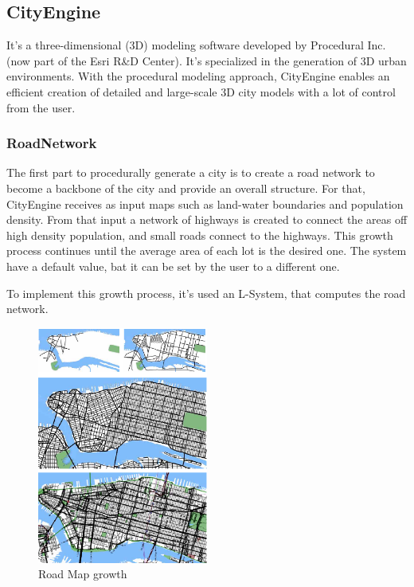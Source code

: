 \subsection{CityEngine \cite{Parish2001} \cite{Muller2006}}

It's a three-dimensional (3D) modeling software developed by Procedural Inc. (now part of the Esri R&D Center). It's specialized in the generation of 3D urban environments. With the procedural modeling approach, CityEngine enables an efficient creation of detailed and large-scale 3D city models with a lot of control from the user. 

\subsubsection{RoadNetwork} %
\label{ssub:roadnetwork1}



The first part to procedurally generate a city is to create a road network to become a backbone of the city and provide an overall structure. For that, CityEngine receives as input maps such as land-water boundaries and population
density. From that input a network of highways is created to connect the areas off high density population, and small roads connect to the highways.
This growth process continues until the average area of each lot is the desired one. The system have a default value, bat it can be set by the user to a different one.

To implement this growth process, it's used an L-System, that computes the road network.


\begin{figure}[htbp]
  \centering
  \includegraphics[width=0.5\textwidth]{img/Procedural-Modeling-of-Cities/Capturar.png}
  \caption{Road Map growth}
  \label{fig:city}
\end{figure}

